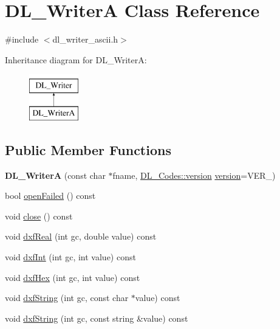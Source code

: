 \hypertarget{classDL__WriterA}{\section{D\-L\-\_\-\-Writer\-A Class Reference}
\label{classDL__WriterA}
}


{\ttfamily \#include $<$dl\-\_\-writer\-\_\-ascii.\-h$>$}

Inheritance diagram for D\-L\-\_\-\-Writer\-A\-:\begin{figure}[H]
\begin{center}
\leavevmode
\includegraphics[height=2.000000cm]{classDL__WriterA}
\end{center}
\end{figure}
\subsection*{Public Member Functions}
\begin{DoxyCompactItemize}
\item 
\hypertarget{classDL__WriterA_a59d5ee4ea070211bd443d632a8e30a91}{{\bfseries D\-L\-\_\-\-Writer\-A} (const char $\ast$fname, \hyperlink{classDL__Codes_a5eba107e2d280c70b52ffab0292fb9dc}{D\-L\-\_\-\-Codes\-::version} \hyperlink{classDL__Writer_af82f15c96f8ddaa4ebfffdb5ea41fb8c}{version}=V\-E\-R\-\_)}\label{classDL__WriterA_a59d5ee4ea070211bd443d632a8e30a91}

\item 
bool \hyperlink{classDL__WriterA_a4407523bec170f67c6f9a19cb6ec592d}{open\-Failed} () const 
\item 
void \hyperlink{classDL__WriterA_a9b558c54eca5f14ac0f040ba0e3d9b84}{close} () const 
\item 
void \hyperlink{classDL__WriterA_a312d2c162e82a838858e8acf512e5786}{dxf\-Real} (int gc, double value) const 
\item 
void \hyperlink{classDL__WriterA_a51ba6db986c225e57f54d99ae9613dc8}{dxf\-Int} (int gc, int value) const 
\item 
void \hyperlink{classDL__WriterA_aa8edb47a42a6b8fc6dd2abb22b168b13}{dxf\-Hex} (int gc, int value) const 
\item 
void \hyperlink{classDL__WriterA_a1ca52fde1bdce2c66c49c0c377e05e1a}{dxf\-String} (int gc, const char $\ast$value) const 
\item 
void \hyperlink{classDL__WriterA_a48438853c9ea284a6d750d7f5b4fa64b}{dxf\-String} (int gc, const string \&value) const 
\end{DoxyCompactItemize}
